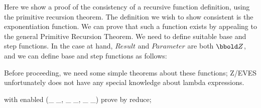 \documentclass{article}
\begin{document}
Here we show a proof of the consistency of a recursive function definition,
using the primitive recursion theorem.
The definition we wish to show consistent is the exponentiation function.
% 
We can prove that such a function exists by appealing to the general
Primitive Recursion Theorem.
%
% 
We need to define suitable base and step functions.  In the case at
hand, $Result$ and $Parameter$ are both $\num$, and we can define base
and step functions as follows:


Before proceeding, we need some simple theorems about these functions;
Z/EVES unfortunately does not have any special knowledge about lambda
expressions.


\begin{zproof}
with enabled (\_ \fun \_, \_ \pfun \_, \_ \rel \_) prove by reduce;
\end{zproof}


\end{document}
